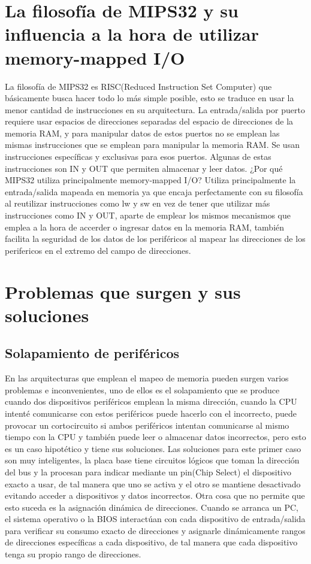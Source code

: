 \documentclass[12pt, a4paper]{article}
\begin{document}
\section{La filosofía de MIPS32 y su influencia a la hora de utilizar memory-mapped I/O}
La filosofía de MIPS32 es RISC(Reduced Instruction Set Computer) que básicamente busca hacer todo lo más simple posible, esto se traduce en usar la menor cantidad de instrucciones en su arquitectura. La entrada/salida por puerto requiere usar espacios de direcciones separadas del espacio de direcciones de la memoria RAM, y para manipular datos de estos puertos no se emplean las mismas instrucciones que se emplean para manipular la memoria RAM. Se usan instrucciones específicas y exclusivas para esos puertos. Algunas de estas instrucciones son IN y OUT que permiten almacenar y leer datos. ¿Por qué MIPS32 utiliza principalmente memory-mapped I/O? Utiliza principalmente la entrada/salida mapeada en memoria ya que encaja perfectamente con su filosofía al reutilizar instrucciones como lw y sw en vez de tener que utilizar más instrucciones como IN y OUT, aparte de emplear los mismos mecanismos que emplea a la hora de accerder o ingresar datos en la memoria RAM, también facilita la seguridad de los datos de los periféricos al mapear las direcciones de los perifericos en el extremo del campo de direcciones.
\section{Problemas que surgen y sus soluciones}
\subsection{Solapamiento de periféricos}
En las arquitecturas que emplean el mapeo de memoria pueden surgen varios problemas e inconvenientes, uno de ellos es el solapamiento que se produce cuando dos dispositivos periféricos emplean la misma dirección, cuando la CPU intenté comunicarse con estos periféricos puede hacerlo con el incorrecto, puede provocar un cortocircuito si ambos periféricos intentan comunicarse al mismo tiempo con la CPU y también puede leer o almacenar datos incorrectos, pero esto es un caso hipotético y tiene sus soluciones. Las soluciones para este primer caso son muy inteligentes, la placa base tiene circuitos lógicos que toman la dirección del bus y la procesan para indicar mediante un pin(Chip Select) el dispositivo exacto a usar, de tal manera que uno se activa y el otro se mantiene desactivado evitando acceder a dispositivos y datos incorrectos. Otra cosa que no permite que esto suceda es la asignación dinámica de direcciones. Cuando se arranca un PC, el sistema operativo o la BIOS interactúan con cada dispositivo de entrada/salida para verificar su consumo exacto de direcciones y asignarle dinámicamente rangos de direcciones específicas a cada dispositivo, de tal manera que cada dispositivo tenga su propio rango de direcciones.
\end{document}
